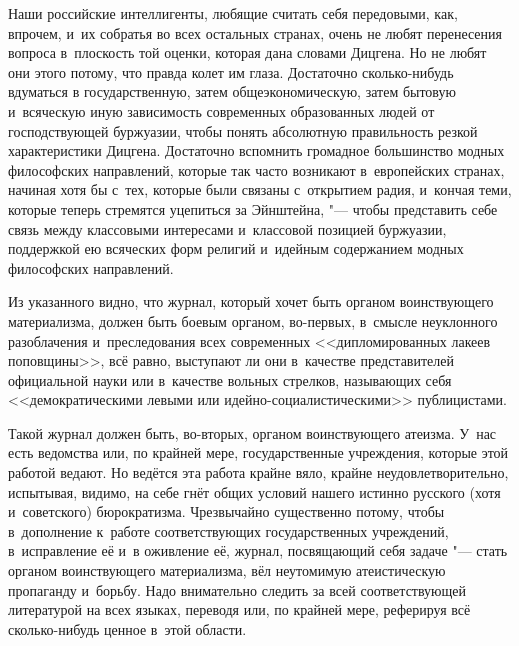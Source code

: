 Наши российские интеллигенты, любящие считать себя передовыми, как, впрочем,
и~их собратья во всех остальных странах, очень не любят перенесения вопроса
в~плоскость той оценки, которая дана словами Дицгена. Но не любят они этого
потому, что правда колет им глаза. Достаточно сколько-нибудь вдуматься в
государственную, затем общеэкономическую, затем бытовую и~всяческую иную
зависимость современных образованных людей от господствующей буржуазии,
чтобы понять абсолютную правильность резкой характеристики
Дицгена. Достаточно вспомнить громадное большинство модных философских
направлений, которые так часто возникают в~европейских странах, начиная хотя
бы с~тех, которые были связаны с~открытием радия, и~кончая теми, которые
теперь стремятся уцепиться за Эйнштейна, "--- чтобы представить себе связь
между классовыми интересами и~классовой позицией буржуазии, поддержкой ею
всяческих форм религий и~идейным содержанием модных философских направлений.

Из указанного видно, что журнал, который хочет быть органом воинствующего
материализма, должен быть боевым органом, во-первых, в~смысле неуклонного
разоблачения и~преследования всех современных <<дипломированных лакеев
поповщины>>, всё равно, выступают ли они в~качестве представителей
официальной науки или в~качестве вольных стрелков, называющих себя
<<демократическими левыми или идейно-социалистическими>> публицистами.

Такой журнал должен быть, во-вторых, органом воинствующего атеизма. У~нас
есть ведомства или, по крайней мере, государственные учреждения, которые
этой работой ведают. Но ведётся эта работа крайне вяло, крайне
неудовлетворительно, испытывая, видимо, на себе гнёт общих условий нашего
истинно русского (хотя и~советского) бюрократизма. Чрезвычайно существенно
потому, чтобы в~дополнение к~работе соответствующих государственных
учреждений, в~исправление её и~в оживление её, журнал, посвящающий себя
задаче "--- стать органом воинствующего материализма, вёл неутомимую
атеистическую пропаганду и~борьбу. Надо внимательно следить за всей
соответствующей литературой на всех языках, переводя или, по крайней мере,
реферируя всё сколько-нибудь ценное в~этой области.

